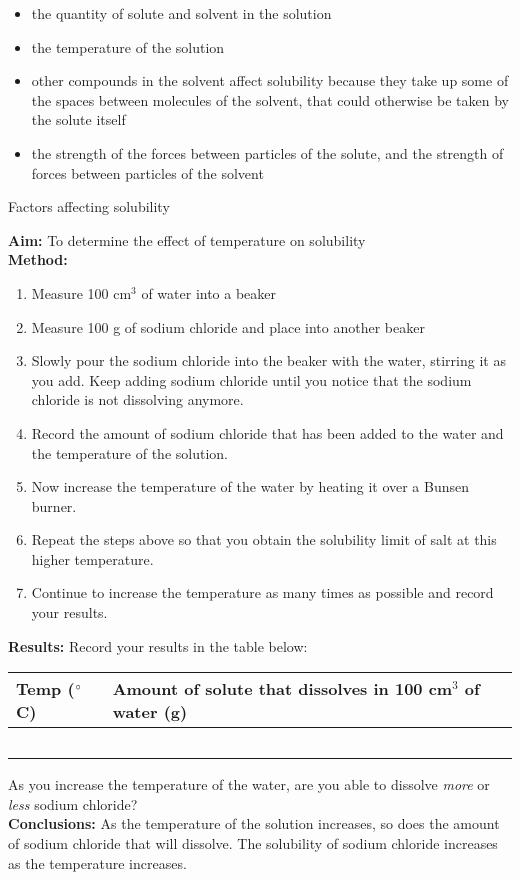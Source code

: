\begin{itemize}
\item{the quantity of solute and solvent in the solution}
\item{the temperature of the solution}
\item{other compounds in the solvent affect solubility because they take up some of the spaces between molecules of the solvent, that could otherwise be taken by the solute itself}
\item{the strength of the forces between particles of the solute, and the strength of forces between particles of the solvent}
\end{itemize}
\begin{g_experiment}{Factors affecting solubility}{

\textbf{Aim: } To determine the effect of temperature on solubility\\
\textbf{Method: }
\begin{enumerate}
\item{Measure 100 cm$^{3}$ of water into a beaker}
\item{Measure 100 g of sodium chloride and place into another beaker}
\item{Slowly pour the sodium chloride into the beaker with the water, stirring it as you add. Keep adding sodium chloride until you notice that the sodium chloride is not dissolving anymore. }
\item{Record the amount of sodium chloride that has been added to the water and the temperature of the solution.}
\item{Now increase the temperature of the water by heating it over a Bunsen burner.}
\item{Repeat the steps above so that you obtain the solubility limit of salt at this higher temperature.}
\item{Continue to increase the temperature as many times as possible and record your results.\\}
\end{enumerate}
\textbf{Results: } Record your results in the table below:
\begin{center}
\begin{tabular}{|p{2cm}|p{5cm}|}\hline
\textbf{Temp} ($^{\circ}$C) & \textbf{Amount of solute that dissolves in 100 cm$^{3}$ of water} (g) \\\hline
&  \\\hline
&  \\\hline
&  \\\hline
&  \\\hline
&  \\\hline
\end{tabular}
\end{center}
As you increase the temperature of the water, are you able to dissolve \textit{more} or \textit{less} sodium chloride?\\
\textbf{Conclusions: } As the temperature of the solution increases, so does the amount of sodium chloride that will dissolve. The solubility of sodium chloride increases as the temperature increases.
}
\end{g_experiment}
